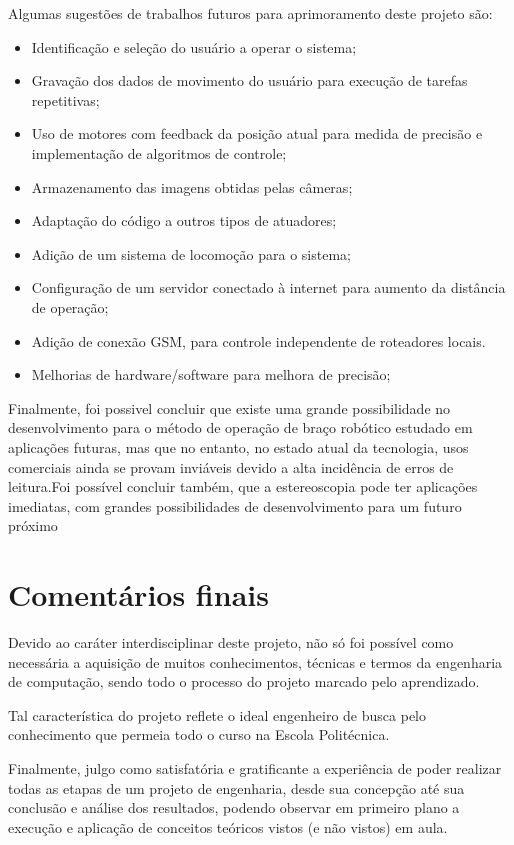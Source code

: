 	Algumas sugestões de trabalhos futuros para aprimoramento deste projeto são:
	\begin{itemize}
	\item Identificação e seleção do usuário a operar o sistema;
	
	\item Gravação dos dados de movimento do usuário para execução de tarefas repetitivas;
	
	\item  Uso de motores com feedback da posição atual para medida de precisão e implementação de algoritmos de controle;
	
	 \item Armazenamento das imagens obtidas pelas câmeras;
	 \item Adaptação do código a outros tipos de atuadores;
	
	 \item Adição de um sistema de locomoção para o sistema;
	 \item Configuração de um servidor conectado à internet para aumento da distância de operação;
	 \item Adição de conexão GSM, para controle independente de roteadores locais.
	 \item  Melhorias de hardware/software para melhora de precisão;
	 
	\end{itemize}

	Finalmente, foi possivel concluir que existe uma grande possibilidade no desenvolvimento para o método de operação de braço robótico estudado em aplicações futuras, mas que no entanto, no estado atual da tecnologia, usos comerciais ainda se provam inviáveis devido a alta incidência de erros de leitura.Foi possível concluir também, que a estereoscopia pode ter aplicações imediatas, com grandes possibilidades de desenvolvimento para um futuro próximo\par
	
	\section*{Comentários finais}\label{sec-comentarios}
	Devido ao caráter interdisciplinar deste projeto, não só foi possível como necessária a aquisição de muitos conhecimentos, técnicas e termos da engenharia de computação, sendo todo o processo do projeto marcado pelo aprendizado.\par
	
	Tal característica do projeto reflete o ideal engenheiro de busca pelo conhecimento que permeia todo o curso na Escola Politécnica.\par
	
	Finalmente, julgo como satisfatória e gratificante a experiência de poder realizar todas as etapas de um projeto de engenharia, desde sua concepção até sua conclusão e análise dos resultados, podendo observar em primeiro plano a execução e aplicação de conceitos teóricos vistos (e não vistos) em aula. 
	
	